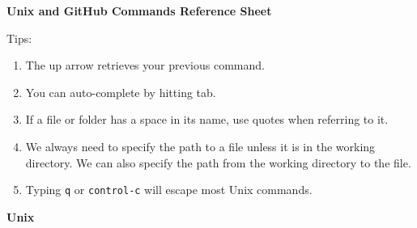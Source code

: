 \documentclass[11pt]{article}
\begin{document}
\large
\begin{tcolorbox}[width=\linewidth, sharp corners=all, colback=white!100!black]


\begin{center} {\LARGE{\bf Unix and GitHub Commands Reference Sheet}} \end{center}

\end{tcolorbox}


Tips:\vspace{-.1in}
\begin{enumerate}
	\item The up arrow retrieves your previous command.
	\item You can auto-complete by hitting tab.
	\item If a file or folder has a space in its name, use quotes when referring to it.
	\item We always need to specify the path to a file unless it is in the working directory. We can also specify the path from the working directory to the file.
	\item Typing \texttt{q} or \texttt{control-c} will escape most Unix commands.
\end{enumerate}

\vspace{.1in}
\begin{tcolorbox}[width=1.03in, sharp corners=all, colback=white!95!black] %
{\bf Unix}
\end{tcolorbox}

\end{document}
